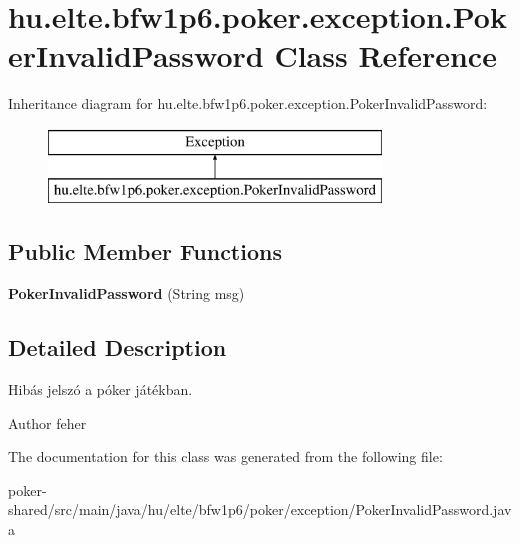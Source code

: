 \hypertarget{classhu_1_1elte_1_1bfw1p6_1_1poker_1_1exception_1_1_poker_invalid_password}{}\section{hu.\+elte.\+bfw1p6.\+poker.\+exception.\+Poker\+Invalid\+Password Class Reference}
\label{classhu_1_1elte_1_1bfw1p6_1_1poker_1_1exception_1_1_poker_invalid_password}
Inheritance diagram for hu.\+elte.\+bfw1p6.\+poker.\+exception.\+Poker\+Invalid\+Password\+:\begin{figure}[H]
\begin{center}
\leavevmode
\includegraphics[height=2.000000cm]{classhu_1_1elte_1_1bfw1p6_1_1poker_1_1exception_1_1_poker_invalid_password}
\end{center}
\end{figure}
\subsection*{Public Member Functions}
\begin{DoxyCompactItemize}
\item 
\hypertarget{classhu_1_1elte_1_1bfw1p6_1_1poker_1_1exception_1_1_poker_invalid_password_a371e59896ac35c95db2e589d34f9dd48}{}{\bfseries Poker\+Invalid\+Password} (String msg)\label{classhu_1_1elte_1_1bfw1p6_1_1poker_1_1exception_1_1_poker_invalid_password_a371e59896ac35c95db2e589d34f9dd48}

\end{DoxyCompactItemize}


\subsection{Detailed Description}
Hibás jelszó a póker játékban. \begin{DoxyAuthor}{Author}
feher 
\end{DoxyAuthor}


The documentation for this class was generated from the following file\+:\begin{DoxyCompactItemize}
\item 
poker-\/shared/src/main/java/hu/elte/bfw1p6/poker/exception/Poker\+Invalid\+Password.\+java\end{DoxyCompactItemize}
